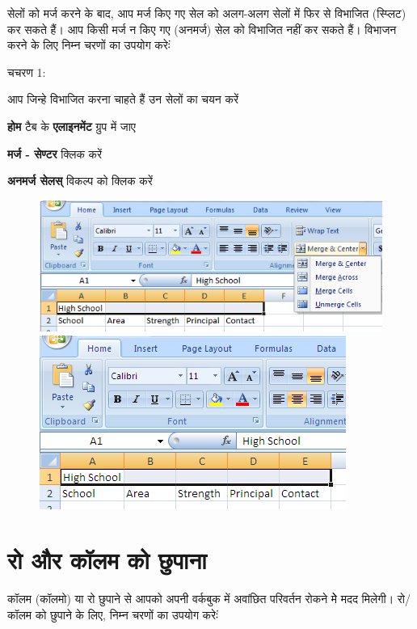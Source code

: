 सेलों को मर्ज करने के बाद, आप मर्ज किए गए सेल को अलग-अलग सेलों में फिर से विभाजित (स्प्लिट) कर सकते हैं। आप किसी मर्ज न किए गए (अनमर्ज) सेल को विभाजित नहीं कर सकते हैं। विभाजन करने के लिए निम्न चरणों का उपयोग करेःं

\begin{descriptionSimple}{चचरण 1:}
\item[चचरण 1] आप जिन्हे विभाजित करना चाहते हैं उन सेलों का चयन करें
\item[चचरण 2] \textbf{होम} टैब के \textbf{एलाइनमेंट} ग्रुप में जाए
\item[चचरण 3] \textbf{मर्ज - सेण्टर} क्लिक करें
\item[चचरण 4] \textbf{अनमर्ज सेलस्} विकल्प को क्लिक करें
\end{descriptionSimple}

\begin{figure}[H]
\centering
\includegraphics[scale=0.37]{src/images/chapter1/chapter1_fig37.png}\qquad
\includegraphics[scale=0.37]{src/images/chapter1/chapter1_fig38.png}
\end{figure}					

\section{रो और कॉलम को छुपाना}\label{id-1.19}

कॉलम (कॉलमो) या रो छुपाने से आपको अपनी वर्कबुक में अवांछित परिवर्तन रोकने मेे मदद मिलेगी। रो/कॉलम को छुपाने के लिए, निम्न चरणों का उपयोग करेःं

